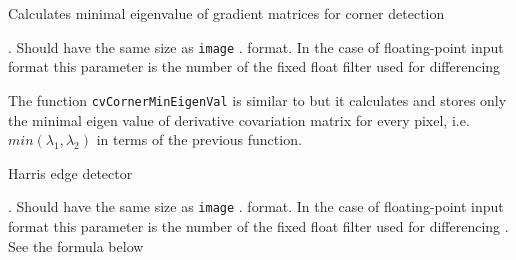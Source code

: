 \label{CornerMinEigenVal}
Calculates minimal eigenvalue of gradient matrices for corner detection

\begin{description}
. Should have the same size as \texttt{image}
. format. In the case of floating-point input format this parameter is the number of the fixed float filter used for differencing
\end{description}

The function \texttt{cvCornerMinEigenVal} is similar to  but it calculates and stores only the minimal eigen value of derivative covariation matrix for every pixel, i.e. $min(\lambda_1, \lambda_2)$ in terms of the previous function.

\label{CornerHarris}
Harris edge detector


\begin{description}
. Should have the same size as \texttt{image}
. format. In the case of floating-point input format this parameter is the number of the fixed float filter used for differencing
. See the formula below
\end{description}

